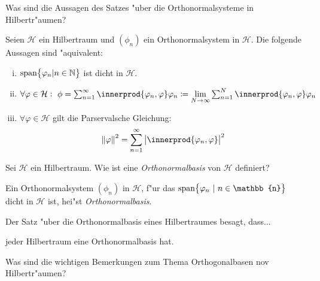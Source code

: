 \documentclass[9pt]{article}
\DeclarePairedDelimiter{\innerprod}\langle\rangle
\newcommand{\Hi}{\mathcal{H}}
\newenvironment{field}{}{\newpage}
\newif\ifnote
\newenvironment{note}{\notetrue}{\notefalse}
\newcommand{\localtag}{}
\newcommand{\globaltag}{}
\newcommand{\uuid}{}
\newcommand{\tags}[1]{
    \ifnote 
        \renewcommand{\localtag}{#1}
    \else
        \renewcommand{\globaltag}{#1}
    \fi 
    }
\newcommand{\xplain}[1]{\renewcommand{\uuid}{#1}}
\begin{document}
	\begin{note}
		\xplain{c58d8f6d-bf9c-4a49-9dcc-5f2f8231b510}
		\tags{satz, ONS, 5.2.13}
		
		\begin{field}  %
			Was sind die Aussagen des Satzes "uber die Orthonormalsysteme in Hilbertr"aumen?
		\end{field}
		
		\begin{field}  %
			Seien $\Hi$ ein Hilbertraum und $(\phi_n)$ ein Orthonormalsystem in $\Hi$. Die folgende Aussagen sind "aquivalent:
			\begin{enumerate}[i)]
				\item $\text{span}\qty{\varphi_n | n\in \mathbb{N}}$ ist dicht in $\Hi$.
				\item $\forall \varphi \in \Hi: \ \phi = \sum_{n=1}^\infty \innerprod{\varphi_n, \varphi}\varphi_n \coloneqq \lim\limits_{N\rightarrow \infty}\sum_{n=1}^N \innerprod{\varphi_n, \varphi}\varphi_n$
				\item $\forall \varphi \in \Hi$ gilt die Parservalsche Gleichung:
					\begin{equation*}
						\norm{\varphi}^2 = \sum_{n=1}^\infty\abs{\innerprod{\varphi_n, \varphi}}^2
					\end{equation*}
			\end{enumerate} 
		\end{field}
		
		\begin{field}  %
			Sei $\Hi$ ein Hilbertraum. Wie ist eine \textit{Orthonormalbasis} von $\Hi$ definiert? 
		\end{field}
			
		\begin{field}  %
			Ein Orthonormalsystem $(\phi_n)$ in $\Hi$, f"ur das $\text{span}\qty{\varphi_n \ | \ n\in \mathbb{n}}$ dicht in $\Hi$ ist, hei"st \textit{Orthonormalbasis}. 
		\end{field}
			
		\begin{field}  %
			Der Satz "uber die Orthonormalbasis eines Hilbertraumes besagt, dass...
		\end{field}
		
		\begin{field}  %
			jeder Hilbertraum eine Orthonormalbasis hat. 
		\end{field}
			
		\begin{field}  %
			Was sind die wichtigen Bemerkungen zum Thema Orthogonalbasen nov Hilbertr"aumen?
		\end{field}
		

\end{note}
\end{document}
